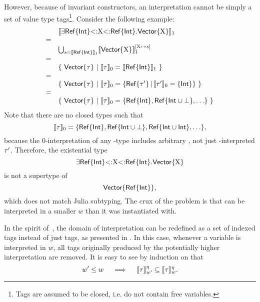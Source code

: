 However, because of invariant constructors, an interpretation cannot be simply 
a set of value type tags\footnote{Tags are assumed to be closed, i.e. do not 
contain free variables.}.
Consider the following example:
\[
    \begin{array}{cl}
        & \interp{\tyexist{\vx}{\tyinv\nref\tyint}{\tyinv\nref\tyint}
            {\tyinv\nvec\vx}}_1 \\
        = & \\
        & \bigcup_{\gtyset = \interp{\tyinv\nref\tyint}_1}
        \interp{\tyinv\nvec\vx}^{\subst{}{\substel{\vx\,}{\,\gtyset}}}_1 \\
        = & \\
        & \{\ 
            \tyinv\nvec\ty \ |\ \interp{\ty}_0 = 
            \interp{\tyinv\nref\tyint}_1
        \ \} \\
        = & \\
        & \{\ 
            \tyinv\nvec\ty \ |\ \interp{\ty}_0 = 
            \{ \tyinv\nref{\ty'}\,|\, \interp{\ty'}_0 = \{ \tyint \} \}
        \ \} \\
        = & \\
        & \{\ 
            \tyinv\nvec\ty \ |\ \interp{\ty}_0 = 
            \{ \tyinv\nref{\tyint}, \tyinv\nref{\tyunion{\tyint}{\tybot}}, \ldots \}
        \ \} \\
    \end{array}
\]
Note that there are no closed types \ty such that
\[
    \llbracket \tau \rrbracket_0 = 
    \{ \mathsf{Ref}\{\mathsf{Int}\}, \mathsf{Ref}\{\mathsf{Int} \cup \bot\}, 
        \mathsf{Ref}\{\mathsf{Int} \cup \mathsf{Int}\}, \ldots \},
\]
because the $0$-interpretation of any \nref-type includes arbitrary 
\tyinv\nref{\ty'}, not just \tyint-interpreted $\tau'$.
Therefore, the existential type 
\[
    \exists\mathsf{Ref}\{\mathsf{Int}\}{\operatorname{<:}}\mathrm{X}{\operatorname{<:}}\mathsf{Ref}\{\mathsf{Int}\}.\mathsf{Vector}\{\mathrm{X}\}
\]
is not a supertype of 
\[ \mathsf{Vector}\{\mathsf{Ref}\{\mathsf{Int}\}\}, \]
which does not match Julia subtyping.
The crux of the problem is that \vx can be interpreted in a smaller $w$
than it was instantiated with.

In the spirit of~\cite{bib:ahmed:impr-poly:2003},
the domain of interpretation can be redefined as a set of indexed tags
instead of just tags, as presented in .
In this case, whenever a variable is interpreted in $w$,
all tags originally produced by the potentially higher interpretation
are removed. It is easy to see by induction on \ty that
\[ 
    w' \leq w \quad\implies\quad
    \llbracket \tau \rrbracket^{\eta}_{w'} \subseteq \llbracket \tau \rrbracket^{\eta}_w.
\]

